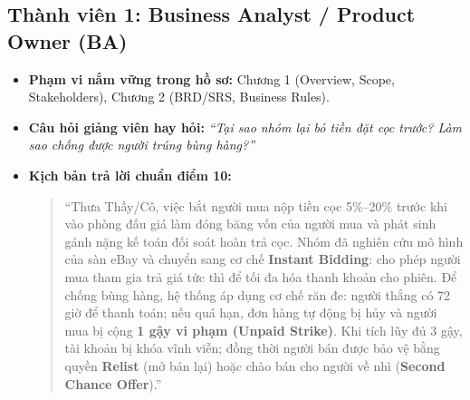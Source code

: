 \documentclass[11pt,a4paper]{article}
\begin{document}
\subsection{Thành viên 1: Business Analyst / Product Owner (BA)}
\begin{itemize}[leftmargin=*]
    \item \textbf{Phạm vi nắm vững trong hồ sơ:} Chương 1 (Overview, Scope, Stakeholders), Chương 2 (BRD/SRS, Business Rules).
    \item \textbf{Câu hỏi giảng viên hay hỏi:} \textit{``Tại sao nhóm lại bỏ tiền đặt cọc trước? Làm sao chống được người trúng bùng hàng?''}
    \item \textbf{Kịch bản trả lời chuẩn điểm 10:}
    \begin{quote}
        \small ``Thưa Thầy/Cô, việc bắt người mua nộp tiền cọc 5\%--20\% trước khi vào phòng đấu giá làm đóng băng vốn của người mua và phát sinh gánh nặng kế toán đối soát hoàn trả cọc. Nhóm đã nghiên cứu mô hình của sàn eBay và chuyển sang cơ chế \textbf{Instant Bidding}: cho phép người mua tham gia trả giá tức thì để tối đa hóa thanh khoản cho phiên. Để chống bùng hàng, hệ thống áp dụng cơ chế răn đe: người thắng có 72 giờ để thanh toán; nếu quá hạn, đơn hàng tự động bị hủy và người mua bị cộng \textbf{1 gậy vi phạm (Unpaid Strike)}. Khi tích lũy đủ 3 gậy, tài khoản bị khóa vĩnh viễn; đồng thời người bán được bảo vệ bằng quyền \textbf{Relist} (mở bán lại) hoặc chào bán cho người về nhì (\textbf{Second Chance Offer}).''
    \end{quote}
\end{itemize}
\end{document}
